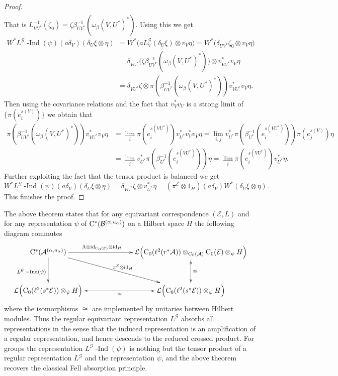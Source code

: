 \documentclass[11 pt, leqno]{amsart}
\numberwithin{equation}{section}
\theoremstyle{plain}
\theoremstyle{definition}
\newcommand*{\Cst}{\mathrm \cst}%
\newcommand*{\contz}{\mathrm{C_0}}%
\DeclareMathOperator{\dashind}{-Ind}
\newcommand{\B}{\mathcal B}
\newcommand{\LL}{\mathcal L}
\newcommand{\G}{\mathcal G} %
\newcommand{\EE}{\mathcal E}
\newcommand{\A}{\mathcal A}
\newcommand{\cst}{\ifmmode\mathrm{C}^*\else{$\mathrm{C}^*$}\fi}
\begin{document}
\begin{proof}
\[\begin{split}
\end{split}
\]
That is $L_{VU^*}^{-1}(\zeta_0) = \zeta \beta_{UV^*}^{-1}(\omega_{\beta}(V,U^*)^*)$. Using this we get 
\[
\begin{split}
    W^* L^{\G}\dashind(\psi) (a\delta_V) (\delta_U\xi \otimes \eta) &= W^* \big( aL_{V}^{\G}(\delta_U\xi) \otimes v_{V}\eta \big) = W^* \big( \delta_{UV^*} \zeta_0 \otimes v_{V}\eta \big) \\
        &= \delta_{VU^*}\Big(\zeta \beta_{UV^*}^{-1}(\omega_{\beta}(V,U^*)^*) \Big)\otimes v_{VU^*}^* v_{V}\eta \\
        &= \delta_{VU^*}\zeta \otimes \pi(\beta_{UV^*}^{-1}(\omega_{\beta}(V,U^*)^*))v_{VU^*}^*v_V\eta.
\end{split}
\]
Then using the covariance relations and the fact that $v_{V}^*v_V$ is a strong limit of $\{\pi(e_i^{s(V)})\}$ we obtain that
\[
\begin{split}
    \pi( \beta_{UV^*}^{-1}(\omega_{\beta}(V,U^*)^*) )v_{VU^*}^*v_V\eta &= \lim_{i}\pi(e_i^{s(VU^*)}) v_{U^*}^*v_{V}^*v_V\eta = \lim_{i,j}v_{U^*}^*\pi(\beta_{U^*}^{-1}(e_i^{s(VU^*)})) \pi(e_j^{s(V)})\eta \\
        &= \lim_{i}v_{U^*}^* \pi( \beta_{U^*}^{-1}(e_i^{s(VU^*)}))\eta = \lim_{i}\pi(e_i^{s(VU^*)})v_{U^*}^*\eta .
\end{split}
\]
Further exploiting the fact that the tensor product is balanced we get
\[
    W^* L^{\G}\dashind(\psi) (a\delta_V)  (\delta_U\xi \otimes \eta) = \delta_{VU^*}\zeta  \otimes v_{U^*}^*\eta = (\pi^{\EE}\otimes 1_{H}) (a\delta_V)  W^*(\delta_U\xi \otimes \eta).
\]
This finishes the proof.
\end{proof}

The above theorem states that for any equivariant correspondence $(\EE, L)$ and for any representation $\psi$ of $\Cst( \B^{(\alpha,u_{\alpha})} )$ on a Hilbert space  $H$ the following diagram commutes
\[
\xymatrixcolsep{2.6pc} \xymatrixrowsep{2.6pc}
\xymatrix{ 
    \Cst( \A^{(\alpha,u_{\alpha})} )	 \ar@{->}[d]_{\text{\normalsize $L^{\G}\dashind(\psi)$}} \ar@{->}[rrd]^{\pi^\EE\otimes\mathrm{id}_{H}} 
    \ar@{->}[rr]^{\Lambda\otimes \mathrm{id}_{\contz(\EE)}\otimes\mathrm{id}_{H} \qquad\qquad \quad} 
    &  & \LL\Big(\contz(\ell^2(r^*\A)) \otimes_{\contz(\A)} \contz(\EE) \otimes_{\psi} H\Big)  \ar@{<->}[d]^{\cong}
    \\
    \LL\Big( \contz(\ell^2(s^*\EE))\otimes_{\psi} H\Big) \ar@{<->}[rr]_{ \cong}%
    & & \LL\Big( \contz(\ell^2(s^*\EE))\otimes_{\psi} H\Big)
    }
\]
where the isomorphisms $\cong$ are implemented by unitaries between Hilbert modules. 
Thus the regular equivariant representation $L^{\G}$ absorbs all representations in the sense that the induced representation is an amplification of a regular representation, and hence descends to the reduced crossed product. 
For groups the representation $L^{\G}\dashind(\psi)$ is nothing but the tensor product of a regular representation $L^{\G}$ and the representation $\psi$, and the above theorem recovers the classical Fell absorption principle.
\end{document}
